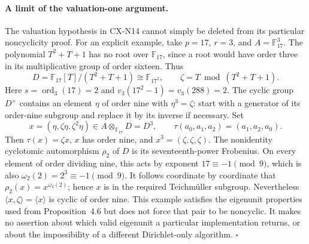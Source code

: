 \paragraph{A limit of the valuation-one argument.}
The valuation hypothesis in CX-N14 cannot simply be deleted from
its particular noncyclicity proof.
For an explicit example, take \(p=17\), \(r=3\), and
\(A=\mathbb F_{17}^3\).
The polynomial \(T^2+T+1\) has no root over \(\mathbb F_{17}\),
since a root would have order three in its multiplicative group
of order sixteen. Thus
\[
 D=\mathbb F_{17}[T]/(T^2+T+1)\cong\mathbb F_{17^2},
 \qquad \zeta=T\bmod(T^2+T+1).
\]
Here \(s=\operatorname{ord}_3(17)=2\) and
\(v_3(17^2-1)=v_3(288)=2\).
The cyclic group \(D^\times\) contains an element \(\eta\) of
order nine with \(\eta^3=\zeta\): start with a generator of its
order-nine subgroup and replace it by its inverse if necessary.
Set
\[
 x=(\eta,\zeta\eta,\zeta^2\eta)\in
 A\otimes_{\mathbb F_{17}}D=D^3,
 \qquad
 \tau(a_0,a_1,a_2)=(a_1,a_2,a_0).
\]
Then \(\tau(x)=\zeta x\), \(x\) has order nine, and
\(x^3=(\zeta,\zeta,\zeta)\).
The nonidentity cyclotomic automorphism \(\rho_2\) of \(D\)
is its seventeenth-power Frobenius.
On every element of order dividing nine, this acts by exponent
\(17\equiv-1\pmod9\), which is also
\(\omega_2(2)=2^3\equiv-1\pmod9\).
It follows coordinate by coordinate that
\(\rho_2(x)=x^{\omega_2(2)}\); hence \(x\) is in the required
Teichm\"uller subgroup.
Nevertheless \(\langle x,\zeta\rangle=\langle x\rangle\)
is cyclic of order nine.
This example satisfies the eigenunit properties used from
Proposition~4.6 but does not force that pair to be noncyclic.
It makes no assertion about which valid eigenunit a particular
implementation returns, or about the impossibility of a different
Dirichlet-only algorithm.
\hfill\(\square\)
